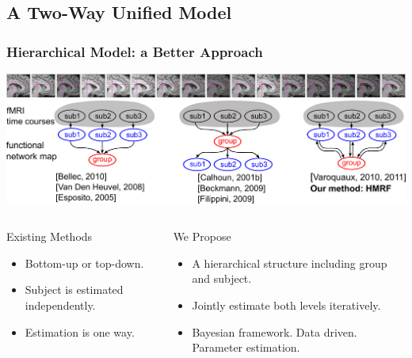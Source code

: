 \documentclass[sansserif, 10pt]{beamer}
\begin{document}
\subsection{A Two-Way Unified Model}
\begin{frame}
  \frametitle{ Hierarchical Model: a Better Approach~\cite{Liu2012}}
  \includegraphics[width=\textwidth]{sfig/allsubs} \\
  \vspace{3pt}
  \includegraphics[width=\textwidth]{sfig/bidirections}\\
  \vspace{3pt}
  \begin{columns}
    \begin{column}{0.4\textwidth}
      \begin{block}{Existing Methods}
        \begin{itemize}
        \item Bottom-up or top-down. 
        \item Subject is estimated independently. 
        \item Estimation is one way. 
        \end{itemize}
      \end{block}
    \end{column}
  
    \begin{column}{0.6\textwidth}
      \begin{block}{We Propose}
        \begin{itemize}

        \item A hierarchical structure including group and subject. 
        \item Jointly estimate both levels iteratively.
        \item Bayesian framework. Data driven. Parameter estimation.
        \end{itemize}
      \end{block}
    \end{column}
  \end{columns}
\end{frame}
\end{document}
